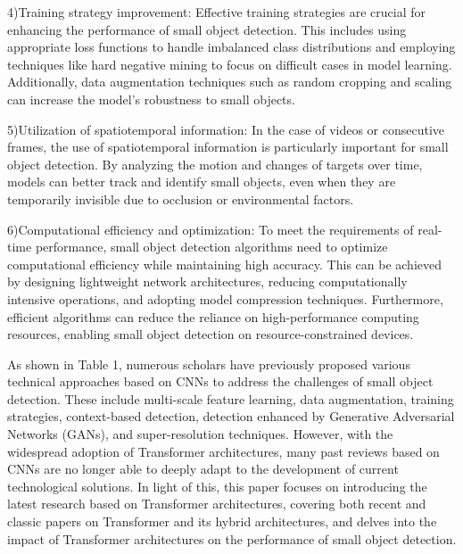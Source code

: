 \documentclass[journal]{IEEEtran}
\begin{document}
  4)Training strategy improvement: Effective training strategies are crucial for enhancing the performance of small object detection. This includes using appropriate loss functions to handle imbalanced class distributions and employing techniques like hard negative mining to focus on difficult cases in model learning. Additionally, data augmentation techniques such as random cropping and scaling can increase the model’s robustness to small objects.
  
  5)Utilization of spatiotemporal information: In the case of videos or consecutive frames, the use of spatiotemporal information is particularly important for small object detection. By analyzing the motion and changes of targets over time, models can better track and identify small objects, even when they are temporarily invisible due to occlusion or environmental factors.
  
  6)Computational efficiency and optimization: To meet the requirements of real-time performance, small object detection algorithms need to optimize computational efficiency while maintaining high accuracy. This can be achieved by designing lightweight network architectures, reducing computationally intensive operations, and adopting model compression techniques. Furthermore, efficient algorithms can reduce the reliance on high-performance computing resources, enabling small object detection on resource-constrained devices.
  
As shown in Table 1, numerous scholars have previously proposed various technical approaches based on CNNs to address the challenges of small object detection. These include multi-scale feature learning, data augmentation, training strategies, context-based detection, detection enhanced by Generative Adversarial Networks (GANs)\cite{aggarwal2021generative}, and super-resolution techniques. However, with the widespread adoption of Transformer architectures, many past reviews based on CNNs are no longer able to deeply adapt to the development of current technological solutions. In light of this, this paper focuses on introducing the latest research based on Transformer architectures, covering both recent and classic papers on Transformer and its hybrid architectures, and delves into the impact of Transformer architectures on the performance of small object detection.
 
\end{document}
